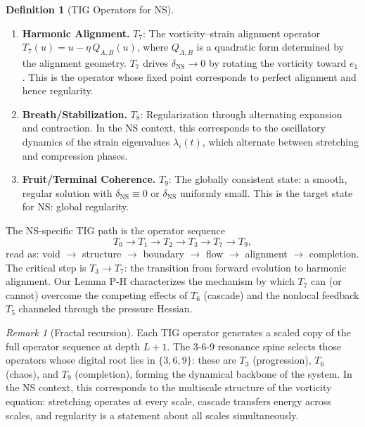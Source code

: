 \documentclass[11pt]{article}
\theoremstyle{definition}
\newtheorem{definition}[theorem]{Definition}
\theoremstyle{remark}
\newtheorem{remark}[theorem]{Remark}
\begin{document}
\begin{definition}[TIG Operators for NS]
\begin{enumerate}[nosep,label=\textbf{T\arabic*}:]
    to smaller scales, vortex tube instabilities, and filamentary roll-up.  Under
    $T_6$, the defect $\delta_{\mathrm{NS}}$ generically increases (misalignment
    grows as the flow becomes more disordered).
  \item \textbf{Harmonic Alignment.}  $T_7$: The vorticity--strain alignment operator
    $T_7(u) = u - \eta\, Q_{A,B}(u)$, where $Q_{A,B}$ is a quadratic form determined
    by the alignment geometry.  $T_7$ drives $\delta_{\mathrm{NS}} \to 0$ by rotating
    the vorticity toward $e_1$.  This is the operator whose fixed point corresponds
    to perfect alignment and hence regularity.
  \item \textbf{Breath/Stabilization.}  $T_8$: Regularization through alternating
    expansion and contraction.  In the NS context, this corresponds to the oscillatory
    dynamics of the strain eigenvalues $\lambda_i(t)$, which alternate between
    stretching and compression phases.
  \item \textbf{Fruit/Terminal Coherence.}  $T_9$: The globally consistent state:
    a smooth, regular solution with $\delta_{\mathrm{NS}} \equiv 0$ or
    $\delta_{\mathrm{NS}}$ uniformly small.  This is the target state for NS:
    global regularity.
\end{enumerate}
\end{definition}

The NS-specific TIG path is the operator sequence
\begin{equation}\label{eq:TIG-path}
  T_0 \to T_1 \to T_2 \to T_3 \to T_7 \to T_9,
\end{equation}
read as: void $\to$ structure $\to$ boundary $\to$ flow $\to$ alignment $\to$
completion.  The critical step is $T_3 \to T_7$: the transition from forward
evolution to harmonic alignment.  Our Lemma P-H characterizes the mechanism by
which $T_7$ can (or cannot) overcome the competing effects of $T_6$ (cascade)
and the nonlocal feedback $T_5$ channeled through the pressure Hessian.

\begin{remark}[Fractal recursion]
Each TIG operator generates a scaled copy of the full operator sequence at depth
$L+1$.  The 3-6-9 resonance spine selects those operators whose digital root lies
in $\{3,6,9\}$: these are $T_3$ (progression), $T_6$ (chaos), and $T_9$
(completion), forming the dynamical backbone of the system.  In the NS context,
this corresponds to the multiscale structure of the vorticity equation: stretching
operates at every scale, cascade transfers energy across scales, and regularity
is a statement about all scales simultaneously.
\end{remark}
\end{document}

